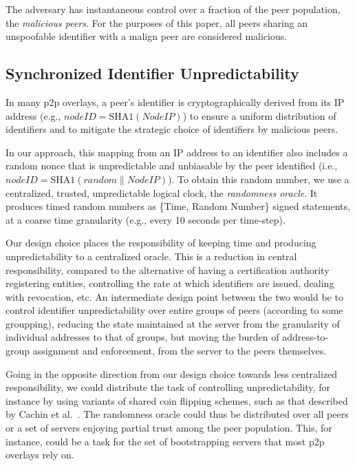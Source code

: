 \documentclass[11pt,twocolumn]{MyTightStyle}
\begin{document}
The adversary has instantaneous control over a fraction of the
peer population, the \emph{malicious peers}.  For the purposes
of this paper, all peers sharing an unspoofable identifier with a
malign peer are considered malicious.


\subsection{Synchronized Identifier Unpredictability}
\label{sec:unpredictability}

In many p2p overlays, a peer's identifier is cryptographically derived
from its IP address (e.g., $\mathit{nodeID} =
\mathrm{SHA1}(\mathit{NodeIP})$) to ensure a uniform distribution of
identifiers and
to mitigate the strategic choice of identifiers by malicious peers.

In our approach, this mapping from an IP address to an identifier also
includes a random nonce that is unpredictable and unbiasable by the peer
identified (i.e., $\mathit{nodeID} = \mathrm{SHA1}(\mathit{random} \|
\mathit{NodeIP})$).  To obtain this random number, we use a centralized,
trusted, unpredictable logical clock, the \emph{randomness oracle}.  It
produces timed random numbers as \{Time, Random Number\} signed
statements, at a coarse time granularity (e.g., every 10 seconds per
time-step).  

Our design choice places the responsibility of keeping time and producing
unpredictability to a centralized oracle.  This is a reduction in
central responsibility, compared to the alternative of having a
certification authority registering entities, controlling the rate at
which identifiers are issued, dealing with revocation, etc.  An
intermediate design point between the two would be to control
identifier unpredictability over entire groups of peers (according to some
groupping), reducing the
state maintained at the server from the granularity of individual
addresses to that of groups, but moving the burden of address-to-group
assignment and enforcement, from the server to the peers themselves.

Going in the opposite direction from our design choice towards less
centralized responsibility, we could distribute the task of controlling
unpredictability, for instance by using variants of shared coin flipping
schemes, such as that described by Cachin et al.~\cite{Cachin2000short}.
The randomness oracle could thus be distributed over all peers or a set
of servers enjoying partial trust among the peer population.  This, for
instance, could be a task for the set of bootstrapping servers that most
p2p overlays rely on.
\end{document}
